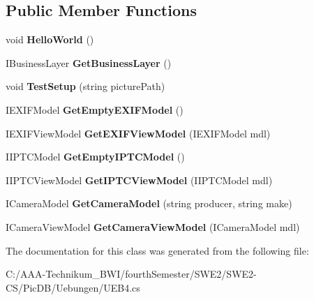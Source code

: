 \subsection*{Public Member Functions}
\begin{DoxyCompactItemize}
\item 
\mbox{\label{class_uebungen_1_1_u_e_b4_abd49ff801aadc4e239f18db6378a42a8}} 
void {\bfseries Hello\+World} ()
\item 
\mbox{\label{class_uebungen_1_1_u_e_b4_a7d863128477eeab6be3b1476ca705c29}} 
I\+Business\+Layer {\bfseries Get\+Business\+Layer} ()
\item 
\mbox{\label{class_uebungen_1_1_u_e_b4_a6cf2b3df3a511be1eebb2b0c8f427d73}} 
void {\bfseries Test\+Setup} (string picture\+Path)
\item 
\mbox{\label{class_uebungen_1_1_u_e_b4_a81eebaff2b2d0a377376d852c04f200c}} 
I\+E\+X\+I\+F\+Model {\bfseries Get\+Empty\+E\+X\+I\+F\+Model} ()
\item 
\mbox{\label{class_uebungen_1_1_u_e_b4_a8b709c7aae6aacf02747e610c520b609}} 
I\+E\+X\+I\+F\+View\+Model {\bfseries Get\+E\+X\+I\+F\+View\+Model} (I\+E\+X\+I\+F\+Model mdl)
\item 
\mbox{\label{class_uebungen_1_1_u_e_b4_ac20ab9917a58302be279e980b77bd005}} 
I\+I\+P\+T\+C\+Model {\bfseries Get\+Empty\+I\+P\+T\+C\+Model} ()
\item 
\mbox{\label{class_uebungen_1_1_u_e_b4_a383b21ad6de3a0efd72b613490d95b99}} 
I\+I\+P\+T\+C\+View\+Model {\bfseries Get\+I\+P\+T\+C\+View\+Model} (I\+I\+P\+T\+C\+Model mdl)
\item 
\mbox{\label{class_uebungen_1_1_u_e_b4_a72b6f9a1cdba644fcc6205e66f4c1e9c}} 
I\+Camera\+Model {\bfseries Get\+Camera\+Model} (string producer, string make)
\item 
\mbox{\label{class_uebungen_1_1_u_e_b4_aa0d23df2f8f8e642ccad7446f0007196}} 
I\+Camera\+View\+Model {\bfseries Get\+Camera\+View\+Model} (I\+Camera\+Model mdl)
\end{DoxyCompactItemize}


The documentation for this class was generated from the following file\+:\begin{DoxyCompactItemize}
\item 
C\+:/\+A\+A\+A-\/\+Technikum\+\_\+\+B\+W\+I/fourth\+Semester/\+S\+W\+E2/\+S\+W\+E2-\/\+C\+S/\+Pic\+D\+B/\+Uebungen/U\+E\+B4.\+cs\end{DoxyCompactItemize}
